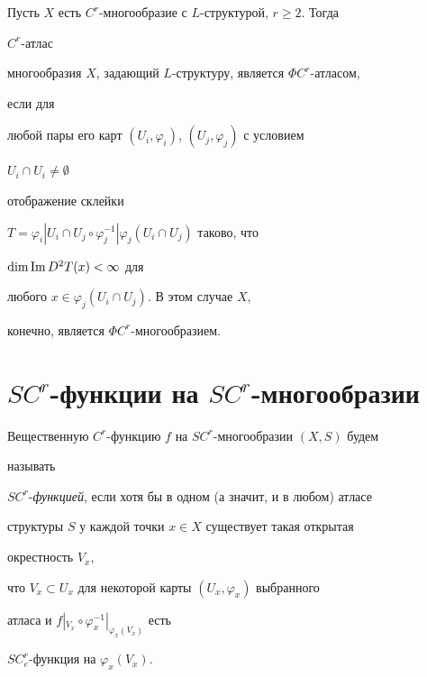 \begin{cors}


Пусть $X$ есть $C^r$-многообразие с $L$-структурой, $r\ge 2$. Тогда


$C^r$-атлас


многообразия $X$, задающий $L$-структуру, является $\Phi C^r$-атласом,


если для


любой пары его карт $(U_i,\varphi_i)$, $(U_j,\varphi_j)$ с условием


$U_i\cap U_i\ne\emptyset$


отображение склейки


$T=\varphi_i| U_i\cap U_j\circ


\varphi^{-1}_j|\varphi_j(U_i\cap U_j)$ таково, что


$\dim\operatorname{Im} D^2T(x)<\infty$ для


любого $x\in\varphi_j(U_i\cap U_j)$. В этом случае $X$,


конечно, является $\Phi C^r$-многообразием.


\end{cors}





\section{$SC^r$-функции на $SC^r$-многообразии}





\begin{defns}


Вещественную $C^r$-функцию $f$ на $SC^r$-многообразии $(X,S)$ будем


называть


$SC^r$-{\em функцией}, если хотя бы в одном (а значит, и в любом) атласе


структуры $S$ у каждой точки $x\in X$ существует такая открытая


окрестность $V_x$,


что $V_x\subset U_x$ для некоторой карты $(U_x,\varphi_x)$ выбранного


атласа и $f|_{V_x}\circ\varphi^{-1}_x|_{\varphi_x(V_x)}$ есть


$SC^r_e$-функция на $\varphi_x(V_x)$.


\end{defns}





